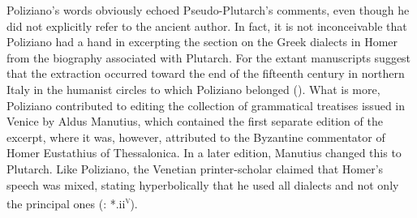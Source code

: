 Poliziano’s words obviously echoed Pseudo-Plutarch’s comments, even though he did not explicitly refer to the ancient author. In fact, it is not inconceivable that Poliziano had a hand in excerpting the section on the Greek dialects in Homer from the biography associated with Plutarch. For the extant manuscripts suggest that the extraction occurred toward the end of the fifteenth century in northern Italy in the humanist circles to which Poliziano belonged (\citealt{VanRooy2018c}). What is more, Poliziano contributed to editing the collection of grammatical treatises issued in Venice by Aldus Manutius, which contained the first separate edition of the excerpt, where it was, however, attributed to the Byzantine commentator of Homer Eustathius of Thessalonica. In a later edition, Manutius changed this to Plutarch. Like Poliziano, the Venetian printer-scholar claimed that Homer’s speech was mixed, stating hyperbolically that he used all dialects and not only the principal ones (\citealt{Manutius1496Aldus}: *.ii\textsc{\textsuperscript{v}}).

